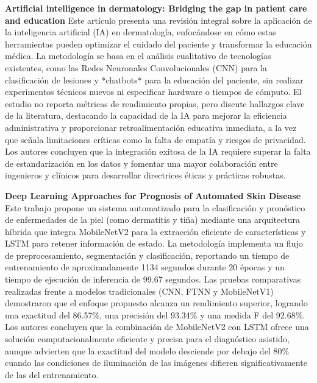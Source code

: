 \documentclass[11pt, a4paper]{article}
\begin{document}
\textbf{Artificial intelligence in dermatology: Bridging the gap in patient care and education} \cite{sohail_artificial_2024}
Este artículo presenta una revisión integral sobre la aplicación de la inteligencia artificial (IA) en dermatología, enfocándose en cómo estas herramientas pueden optimizar el cuidado del paciente y transformar la educación médica.
La metodología se basa en el análisis cualitativo de tecnologías existentes, como las Redes Neuronales Convolucionales (CNN) para la clasificación de lesiones y *chatbots* para la educación del paciente, sin realizar experimentos técnicos
nuevos ni especificar hardware o tiempos de cómputo. El estudio no reporta métricas de rendimiento propias, pero discute hallazgos clave de la literatura, destacando la capacidad de la IA para mejorar la eficiencia administrativa y 
proporcionar retroalimentación educativa inmediata, a la vez que señala limitaciones críticas como la falta de empatía y riesgos de privacidad. Los autores concluyen que la integración exitosa de la IA requiere superar la falta de
estandarización en los datos y fomentar una mayor colaboración entre ingenieros y clínicos para desarrollar directrices éticas y prácticas robustas.

\textbf{Deep Learning Approaches for Prognosis of Automated Skin Disease} \cite{kshirsagar_deep_2022}
Este trabajo propone un sistema automatizado para la clasificación y pronóstico de enfermedades de la piel (como dermatitis y tiña) mediante una arquitectura híbrida que integra MobileNetV2 para la extracción eficiente de características
y LSTM para retener información de estado. La metodología implementa un flujo de preprocesamiento, segmentación y clasificación, reportando un tiempo de entrenamiento de aproximadamente 1134 segundos durante 20 épocas y un tiempo de 
ejecución de inferencia de 99.67 segundos. Las pruebas comparativas realizadas frente a modelos tradicionales (CNN, FTNN y MobileNetV1) demostraron que el enfoque propuesto alcanza un rendimiento superior, logrando una exactitud del
86.57\%, una precisión del 93.34\% y una medida F del 92.68\%. Los autores concluyen que la combinación de MobileNetV2 con LSTM ofrece una solución computacionalmente eficiente y precisa para el diagnóstico asistido, aunque advierten
que la exactitud del modelo desciende por debajo del 80\% cuando las condiciones de iluminación de las imágenes difieren significativamente de las del entrenamiento.
\end{document}

